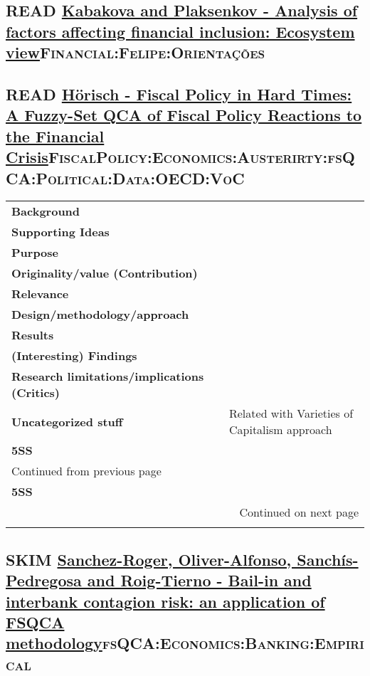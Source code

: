 \documentclass[11pt]{article}
\begin{document}
\subsection*{{\bfseries\sffamily READ} \href{https://doi.org/10.1016/j.jbusres.2018.01.066}{Kabakova and Plaksenkov - Analysis of factors affecting financial inclusion: Ecosystem view}\hfill{}\textsc{Financial:Felipe:Orientações}}
\label{sec:orgc3c3629}
\subsection*{{\bfseries\sffamily READ} \href{https://doi.org/10.1007/s12286-013-0152-y}{Hörisch -  Fiscal Policy in Hard Times: A Fuzzy-Set QCA of Fiscal Policy Reactions to the Financial Crisis}\hfill{}\textsc{FiscalPolicy:Economics:Austerirty:fsQCA:Political:Data:OECD:VoC}}
\label{sec:org541e684}
\begin{longtable}{l|p{}}
\hline
\hline
\textbf{Background} & \\
\textbf{Supporting Ideas} & \\
\textbf{Purpose} & \\
\textbf{Originality/value (Contribution)} & \\
\textbf{Relevance} & \\
\textbf{Design/methodology/approach} & \\
\textbf{Results} & \\
\textbf{(Interesting) Findings} & \\
\textbf{Research limitations/implications (Critics)} & \\
\textbf{Uncategorized stuff} & Related with Varieties of Capitalism approach\\
\textbf{5SS} & \\
\hline
\endfirsthead
\multicolumn{2}{l}{Continued from previous page} \\

\textbf{5SS} &  \\

\hline
\endhead
\hline\multicolumn{2}{r}{Continued on next page} \\
\endfoot
\endlastfoot
\hline
\hline
\end{longtable}

\subsection*{{\bfseries\sffamily SKIM} \href{https://doi.org/10.9770/jesi.2020.7.4(3)}{Sanchez-Roger, Oliver-Alfonso, Sanchís-Pedregosa and Roig-Tierno -  Bail-in and interbank contagion risk: an application of FSQCA methodology}\hfill{}\textsc{fsQCA:Economics:Banking:Empirical}}
\label{sec:org0040e83}
\end{document}
